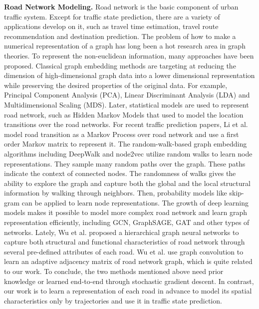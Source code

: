 \textbf{Road Network Modeling.} Road network is the basic component of urban traffic system. Except for traffic state prediction, there are a variety of applications develop on it, such as travel time estimation\cite{tte}, travel route recommendation\cite{route_recommend} and destination prediction\cite{dest_pred}. The problem of how to make a numerical representation of a graph has long been a hot research area in graph theories. To represent the non-euclidean information, many approaches have been proposed. Classical graph embedding methods are targeting at reducing the dimension of high-dimensional graph data into a lower dimensional representation while preserving the desired properties of the original data. For example, Principal Component Analysis (PCA)\cite{PCA}, Linear Discriminant Analysis (LDA)\cite{LDA} and Multidimensional Scaling (MDS)\cite{MDS}. Later, statistical models are used to represent road network, such as Hidden Markov Models\cite{HMMM} that used to model the location transitions over the road networks. For recent traffic prediction papers, Li et al.\cite{AAAI21} model road transition as a Markov Process over road network and use a first order Markov matrix to represent it. The random-walk-based graph embedding algorithms including DeepWalk\cite{deepwalk} and node2vec\cite{node2vec} utilize random walks to learn node representations. They sample many random paths over the graph. These paths indicate the context of connected nodes. The randomness of walks gives the ability to explore the graph and capture both the global and the local structural information by walking through neighbors. Then, probability models like skip-gram\cite{sg} can be applied to learn node representations. The growth of deep learning models makes it possible to model more complex road network and learn graph representation efficiently, including GCN\cite{GCN0}, GraphSAGE\cite{graphsage}, GAT\cite{GAT} and other types of networks. Lately, Wu et al.\cite{roadrep} proposed a hierarchical graph neural networks to capture both structural and functional characteristics of road network through several pre-defined attributes of each road. Wu et al.\cite{GWNET} use graph convolution to learn an adaptive adjacency matrix of road network graph, which is quite related to our work. To conclude, the two methods mentioned above need prior knowledge or learned end-to-end through stochastic gradient descent. In contrast, our work is to learn a representation of each road in advance to model its spatial characteristics only by trajectories and use it in traffic state prediction.

